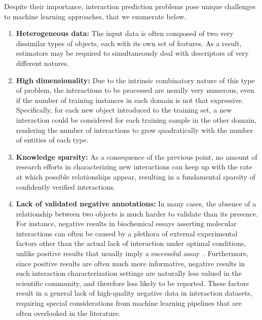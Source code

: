 Despite their importance, interaction prediction problems pose unique challenges to machine learning approaches, that we enumerate below.
%
\begin{enumerate}
    \item \textbf{Heterogeneous data:} The input data is often composed of two very dissimilar types of objects, each with its own set of features. As a result, estimators may be required to simultaneously deal with descriptors of very different natures.%
    \item \textbf{High dimensionality:} Due to the intrinsic combinatory nature of this type of problem, the interactions to be processed are usually very numerous, even if the number of training instances in each domain is not that expressive. Specifically, for each new object introduced to the training set, a new interaction could be considered for each training sample in the other domain, rendering the number of interactions to grow quadratically with the number of entities of each type.
    \item \textbf{Knowledge sparsity:} As a consequence of the previous point, no amount of research efforts in characterizing new interactions can keep up with the rate at which possible relationships appear, resulting in a fundamental sparsity of confidently verified interactions.
    \item \textbf{Lack of validated negative annotations:} In many cases, the absence of a relationship between two objects is much harder to validate than its presence. For instance, negative results in biochemical essays asserting molecular interactions can often be caused by a plethora of external experimental factors other than the actual lack of interaction under optimal conditions, unlike positive results that usually imply a successful assay~\cite{chen2018machine,pahikkala2015more}. Furthermore, since positive results are often much more informative, negative results in such interaction characterization settings are naturally less valued in the scientific community, and therefore less likely to be reported. These factors result in a general lack of high-quality negative data in interaction datasets, requiring special considerations from machine learning pipelines that are often overlooked in the literature.

\end{enumerate}
